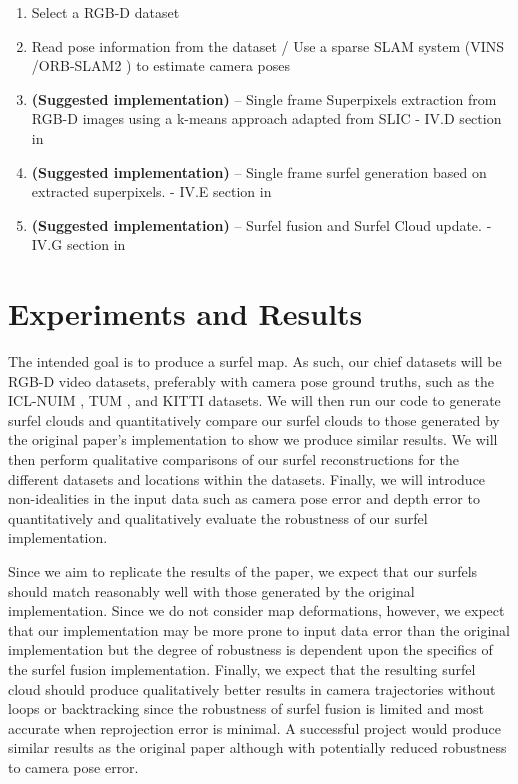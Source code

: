 \documentclass{article}
\begin{document}
\begin{enumerate}
    \item Select a RGB-D dataset \cite{handa2014benchmark,sturm12iros_TUM,Menze2015CVPR_KITTI}
    
    \item Read pose information from the dataset / Use a sparse SLAM system (VINS \cite{qin2018vins}/ORB-SLAM2 \cite{mur2017orb}) to
    estimate camera poses
    
    \item \textbf{(Suggested implementation)} -- Single frame Superpixels extraction from RGB-D images using a k-means approach adapted from SLIC \cite{achanta2012slic} - IV.D section in \cite{Wang19icra_surfelDense}
    
    \item \textbf{(Suggested implementation)} -- Single frame surfel generation based on extracted superpixels. - IV.E section in \cite{Wang19icra_surfelDense}
    
    \item \textbf{(Suggested implementation)} --  Surfel fusion and Surfel Cloud update. - IV.G section in \cite{Wang19icra_surfelDense}
    
\end{enumerate}


\section{Experiments and Results}

    The intended goal is to produce a surfel map.  As such, our chief datasets will be RGB-D video datasets, preferably with camera pose ground truths, such as the ICL-NUIM \cite{handa2014benchmark}, TUM \cite{sturm12iros_TUM}, and KITTI \cite{Menze2015CVPR_KITTI} datasets.  We will then run our code to generate surfel clouds and quantitatively compare our surfel clouds to those generated by the original paper's implementation \cite{Wang19github} to show we produce similar results.  We will then perform qualitative comparisons of our surfel reconstructions for the different datasets and locations within the datasets. Finally, we will introduce non-idealities in the input data such as camera pose error and depth error to quantitatively and qualitatively evaluate the robustness of our surfel implementation.
    
    Since we aim to replicate the results of the paper, we expect that our surfels should match reasonably well with those generated by the original implementation.  Since we do not consider map deformations, however, we expect that our implementation may be more prone to input data error than the original implementation but the degree of robustness is dependent upon the specifics of the surfel fusion implementation.  Finally, we expect that the resulting surfel cloud should produce qualitatively better results in camera trajectories without loops or backtracking since the robustness of surfel fusion is limited and most accurate when reprojection error is minimal.  A successful project would produce similar results as the original paper although with potentially reduced robustness to camera pose error.
    
\end{document}
